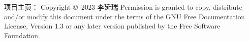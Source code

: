 \blank[line]
项目主页：{\tta{}}
\vfill
Copyright \copyright\  2023  李延瑞
\blank
Permission is granted to copy, distribute and/or modify this document under the terms of the GNU Free Documentation License, Version 1.3 or any later version published by the Free Software Foundation.
\stopstandardmakeup